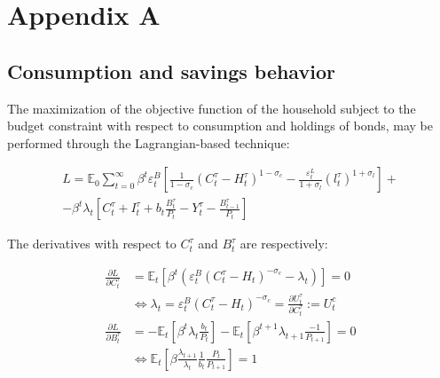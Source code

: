 \documentclass{pracamgr}
\numberwithin{equation}{section}
\begin{document}
\newpage

\chapter*{Appendix A} \label{Appendix A}

\section*{Consumption and savings behavior}

The maximization of the objective function of the household subject to the budget constraint with respect to consumption and holdings of bonds, may be performed through the Lagrangian-based technique:

\begin{equation}
\begin{split}
L = \mathbb{E}_{0} \sum\limits_{t=0}^{\infty} \beta^{t} \varepsilon_{t}^{B} \left[ \frac{1}{1-\sigma_{c}} \left( C_{t}^{\tau} - H_{t}^{\tau} \right)^{1-\sigma_{c}} - \frac{\varepsilon_{t}^{L}}{1+\sigma_{l}} \left( l_{t}^{\tau} \right)^{1+\sigma_{l}} \right] + \\
- \beta^{t} \lambda_{t} \left[ C_{t}^{\tau} + I_{t}^{\tau} + b_{t} \frac{B_{t}^{\tau}}{P_{t}} - Y_{t}^{\tau} - \frac{B_{t-1}^{\tau}}{P_{t}} \right]
\end{split}
\end{equation}

The derivatives with respect to $C_{t}^{\tau}$ and $B_{t}^{\tau}$ are respectively:

\begin{align}
\frac{\partial L}{\partial C_{t}^{\tau}} &= \mathbb{E}_{t} \left[ \beta^{t} \left( \varepsilon_{t}^{B} (
C_{t}^{\tau} - H_{t} )^{-\sigma_{c}} - \lambda_{t} \right) \right]  = 0  \nonumber \\ 
& \iff \lambda_{t} =  \varepsilon_{t}^{B} (C_{t}^{\tau} - H_{t} )^{-\sigma_{c}} = \frac{\partial U_{t}^{\tau}}{\partial C_{t}^{\tau}} := U_{t}^{c} \label{FOC_C} \\
\frac{\partial L}{\partial B_{t}^{\tau}} &= -\mathbb{E}_{t} \left[ \beta^{t} \lambda_{t} \frac{b_{t}}{P_{t}} \right] - \mathbb{E}_{t} \left[ \beta^{t+1} \lambda_{t+1} \frac{-1}{P_{t+1}} \right] = 0 \nonumber \\
& \iff \mathbb{E}_{t} \left[ \beta \frac{\lambda_{t+1}}{\lambda_{t}} \frac{1}{b_{t}} \frac{P_{t}}{P_{t+1}} \right] = 1 \label{FOC_B} 
\end{align}
\end{document}
